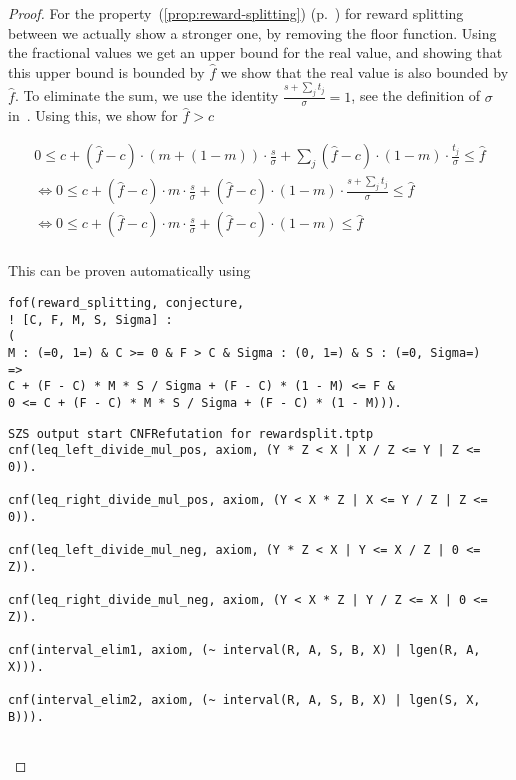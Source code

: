 \begin{proof}
  For the property~(\ref{prop:reward-splitting})
  (p.~\pageref{prop:reward-splitting}) for reward splitting between we actually
  show a stronger one, by removing the floor function. Using the fractional
  values we get an upper bound for the real value, and showing that this upper
  bound is bounded by $\hat{f}$ we show that the real value is also bounded by
  $\hat{f}$. To eliminate the sum, we use the identity
  $\frac{s + \sum_{j}t_{j}}{\sigma} = 1$, see the definition of $\sigma$
  in~\cite{delegation_design}. Using this, we show for $\hat{f} > c$

  \begin{multline*}
    0 \leq c + (\hat{f} - c)\cdot (m + (1 - m))\cdot \frac{s}{\sigma} +
    \sum_{j}(\hat{f}-c)\cdot(1-m)\cdot\frac{t_{j}}{\sigma} \leq \hat{f} \\
    \Leftrightarrow
    0\leq c + (\hat{f}-c)\cdot m \cdot \frac{s}{\sigma} + (\hat{f}
    -c)\cdot(1-m)\cdot\frac{s + \sum_{j}t_{j}}{\sigma} \leq \hat{f} \\
    \Leftrightarrow
    0\leq c + (\hat{f}-c)\cdot m \cdot \frac{s}{\sigma} + (\hat{f}
    -c)\cdot(1-m) \leq \hat{f} \\
  \end{multline*}

  This can be proven automatically using

\begin{verbatim}
fof(reward_splitting, conjecture,
! [C, F, M, S, Sigma] :
(
M : (=0, 1=) & C >= 0 & F > C & Sigma : (0, 1=) & S : (=0, Sigma=)
=>
C + (F - C) * M * S / Sigma + (F - C) * (1 - M) <= F &
0 <= C + (F - C) * M * S / Sigma + (F - C) * (1 - M))).
\end{verbatim}

  \ifproofs
\begin{verbatim}
SZS output start CNFRefutation for rewardsplit.tptp
cnf(leq_left_divide_mul_pos, axiom, (Y * Z < X | X / Z <= Y | Z <= 0)).

cnf(leq_right_divide_mul_pos, axiom, (Y < X * Z | X <= Y / Z | Z <= 0)).

cnf(leq_left_divide_mul_neg, axiom, (Y * Z < X | Y <= X / Z | 0 <= Z)).

cnf(leq_right_divide_mul_neg, axiom, (Y < X * Z | Y / Z <= X | 0 <= Z)).

cnf(interval_elim1, axiom, (~ interval(R, A, S, B, X) | lgen(R, A, X))).

cnf(interval_elim2, axiom, (~ interval(R, A, S, B, X) | lgen(S, X, B))).


\end{verbatim}
\end{proof}

